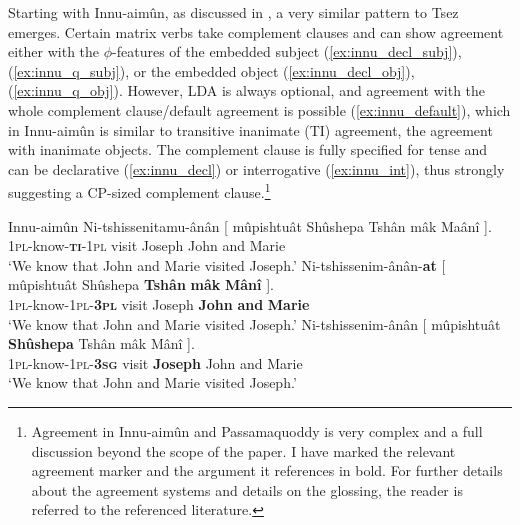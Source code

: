 \documentclass[output=paper
,modfonts
,nonflat]{langsci/langscibook}
\begin{document}
Starting with Innu-aim\^{u}n, as discussed in \citet{Branigan_MacKenzie2002}, a very similar pattern to Tsez emerges. Certain matrix verbs take complement clauses and can show agreement either with the $ \phi $-features of the embedded subject (\ref{ex:innu_decl_subj}), (\ref{ex:innu_q_subj}), or the embedded object (\ref{ex:innu_decl_obj}), (\ref{ex:innu_q_obj}). However, LDA is always optional, and agreement with the whole complement clause/default agreement is possible (\ref{ex:innu_default}), which in Innu-aim\^{u}n is similar to transitive inanimate (TI) agreement, the agreement with inanimate objects. The complement clause is fully specified for tense and can be declarative (\ref{ex:innu_decl}) or interrogative (\ref{ex:innu_int}), thus strongly suggesting a CP-sized complement clause.\footnote{Agreement in Innu-aim\^{u}n and Passamaquoddy is very complex and a full discussion beyond the scope of the paper. I have marked the relevant agreement marker and the argument it references in bold. For further details about the agreement systems and details on the glossing, the reader is referred to the referenced literature.} %
\begin{exe}
\ex Innu-aim\^{u}n \citep[][388]{Branigan_MacKenzie2002} \label{ex:innu_decl}
	\xlist
	\ex \label{ex:innu_default}
		\gll Ni-tshissenitamu-\^{a}n\^{a}n [ m\^{u}pishtu\^{a}t Sh\^{u}shepa Tsh\^{a}n m\^{a}k Ma\^{a}n\^{i} ].\\
			 \textsc{1pl}-know-\textsc{\textbf{ti}-1pl} {} visit Joseph John and Marie\\
		\glt `We know that John and Marie visited Joseph.'
	\ex \label{ex:innu_decl_subj}
		\gll Ni-tshissenim-\^{a}n\^{a}n-\textbf{at} [ m\^{u}pishtu\^{a}t Sh\^{u}shepa \textbf{Tsh\^{a}n} \textbf{m\^{a}k} \textbf{M\^{a}n\^{i}} ].\\
			 \textsc{1pl}-know-\textsc{1pl-\textbf{3pl}} {} visit Joseph \textbf{John} \textbf{and} \textbf{Marie}\\
		\glt `We know that John and Marie visited Joseph.'
	\ex \label{ex:innu_decl_obj}
		\gll Ni-tshissenim-\^{a}n\^{a}n [ m\^{u}pishtu\^{a}t \textbf{Sh\^{u}shepa} Tsh\^{a}n m\^{a}k M\^{a}n\^{i} ].\\
			 \textsc{1pl}-know-\textsc{1pl-\textbf{3sg}} {} visit \textbf{Joseph} John and Marie\\
		\glt `We know that John and Marie visited Joseph.'
	\endxlist
\end{exe}
\end{document}

